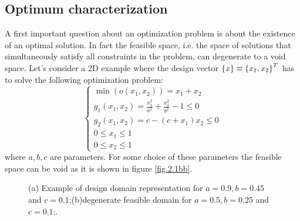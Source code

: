 \subsection {Optimum characterization}
A first important question about an optimization problem is about the existence of an optimal solution. In fact the feasible space, i.e. the space of solutions that simultaneously satisfy all constraints in the problem, can degenerate to a void space. Let's consider a 2D example where the design vector $\left\lbrace{x}\right \rbrace\equiv\left\lbrace{x_1,x_2}\right \rbrace^T$ has to solve the following optimization problem:
\begin{equation}
\begin{cases}
\min(o(x_1,x_2))=x_1+x_2\\
g_1(x_1,x_2)=\frac{x_1^2}{a^2}+\frac{x_2^2}{b^2}-1\leq 0\\
g_2(x_1,x_2)=c-(c+x_1)x_2\leq 0\\
0\leq x_1\leq 1\\
0\leq x_2 \leq 1
\end{cases}
\end{equation}
where $a,b,c$ are parameters. For some choice of these parameters the feasible space can be void as it is shown in figure \ref{fig.2.1bb}. 
\begin{figure}[hbt!]
  \centering
       \caption{(a) Example of design domain representation for $a=0.9,b=0.45$ and $c=0.1$;(b)degenerate feasible domain for $a=0.5,b=0.25$ and $c=0.1$;.}
       \label{fig.2.1b}
     \end{figure}
